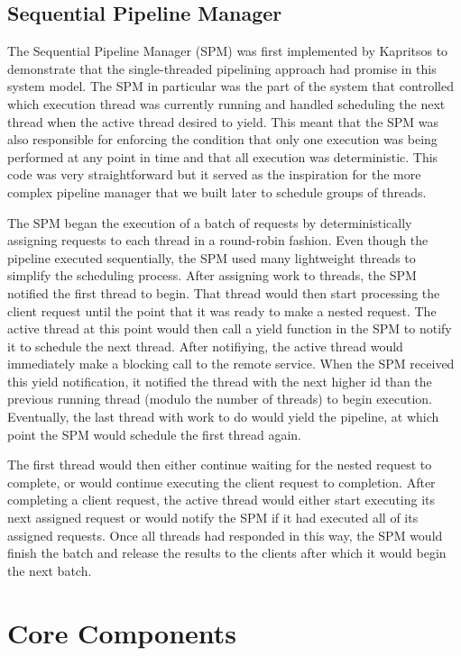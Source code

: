 \documentclass[11pt, oneside]{report}
\begin{document}
\subsection{Sequential Pipeline Manager}\label{SPM}

The Sequential Pipeline Manager (SPM) was first implemented by Kapritsos to demonstrate that the single-threaded pipelining approach had promise in this system model. 
The SPM in particular was the part of the system that controlled which execution thread was currently running and handled scheduling the next thread when the active thread desired to yield.
This meant that the SPM was also responsible for enforcing the condition that only one execution was being performed at any point in time and that all execution was deterministic.
This code was very straightforward but it served as the inspiration for the more complex pipeline manager that we built later to schedule groups of threads.

The SPM began the execution of a batch of requests by deterministically assigning requests to each thread in a round-robin fashion.
Even though the pipeline executed sequentially, the SPM used many lightweight threads to simplify the scheduling process. 
After assigning work to threads, the SPM notified the first thread to begin. 
That thread would then start processing the client request until the point that it was ready to make a nested request. 
The active thread at this point would then call a yield function in the SPM to notify it to schedule the next thread. After notifiying, the active thread would immediately make a blocking call to the remote service. 
When the SPM received this yield notification, it notified the thread with the next higher id than the previous running thread (modulo the number of threads) to begin execution. 
Eventually, the last thread with work to do would yield the pipeline, at which point the SPM would schedule the first thread again. 

The first thread would then either continue waiting for the nested request to complete, or would continue executing the client request to completion. 
After completing a client request, the active thread would either start executing its next assigned request or would notify the SPM if it had executed all of its assigned requests.
Once all threads had responded in this way, the SPM would finish the batch and release the results to the clients after which it would begin the next batch.

\section{Core Components}
\end{document}
